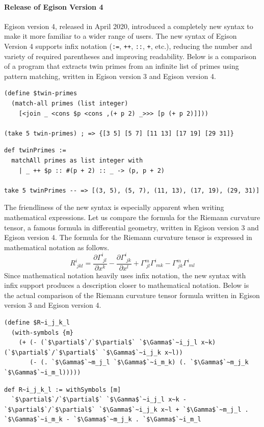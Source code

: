 \begin{framed}
  \paragraph{Release of Egison Version 4}
Egison version 4, released in April 2020, introduced a completely new syntax to make it more familiar to a wider range of users.
The new syntax of Egison Version 4 supports infix notation (\lstinline{:=}, \lstinline{++}, \lstinline{::}, \lstinline{+}, etc.), reducing the number and variety of required parentheses and improving readability.
Below is a comparison of a program that extracts twin primes from an infinite list of primes using pattern matching, written in Egison version 3 and Egison version 4.
\begin{lstlisting}[caption=Egison version 3,language=egison,numbers=none]
(define $twin-primes
  (match-all primes (list integer)
    [<join _ <cons $p <cons ,(+ p 2) _>>> [p (+ p 2)]]))

(take 5 twin-primes) ; => {[3 5] [5 7] [11 13] [17 19] [29 31]}
\end{lstlisting}
\begin{lstlisting}[caption=Egison version 4,language=egison,numbers=none]
def twinPrimes :=
  matchAll primes as list integer with
    | _ ++ $p :: #(p + 2) :: _ -> (p, p + 2)

take 5 twinPrimes -- => [(3, 5), (5, 7), (11, 13), (17, 19), (29, 31)]
\end{lstlisting}

The friendliness of the new syntax is especially apparent when writing mathematical expressions.
Let us compare the formula for the Riemann curvature tensor, a famous formula in differential geometry, written in Egison version 3 and Egison version 4.
The formula for the Riemann curvature tensor is expressed in mathematical notation as follows.
\[R^{i}_{\;jkl} = \frac{\partial \Gamma^{i}_{\;jl}}{\partial x^k} - \frac{\partial \Gamma^{i}_{\;jk}}{\partial x^l} + \Gamma^{m}_{\;jl} \Gamma^{i}_{\;mk} - \Gamma^{m}_{\;jk} \Gamma^{i}_{\;ml} \]
Since mathematical notation heavily uses infix notation, the new syntax with infix support produces a description closer to mathematical notation.
Below is the actual comparison of the Riemann curvature tensor formula written in Egison version 3 and Egison version 4.
\begin{lstlisting}[caption=Egison version 3,language=egison,numbers=none]
(define $R~i_j_k_l
  (with-symbols {m}
    (+ (- (`$\partial$`/`$\partial$` `$\Gamma$`~i_j_l x~k) (`$\partial$`/`$\partial$` `$\Gamma$`~i_j_k x~l))
       (- (. `$\Gamma$`~m_j_l `$\Gamma$`~i_m_k) (. `$\Gamma$`~m_j_k `$\Gamma$`~i_m_l)))))
\end{lstlisting}
\begin{lstlisting}[caption=Egison version 4,language=egison,numbers=none]
def R~i_j_k_l := withSymbols [m]
  `$\partial$`/`$\partial$` `$\Gamma$`~i_j_l x~k - `$\partial$`/`$\partial$` `$\Gamma$`~i_j_k x~l + `$\Gamma$`~m_j_l . `$\Gamma$`~i_m_k - `$\Gamma$`~m_j_k . `$\Gamma$`~i_m_l
\end{lstlisting}
\end{framed}


